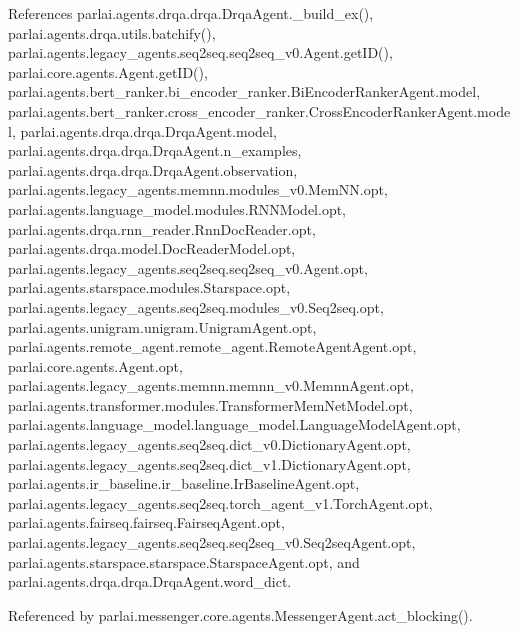 References parlai.\+agents.\+drqa.\+drqa.\+Drqa\+Agent.\+\_\+build\+\_\+ex(), parlai.\+agents.\+drqa.\+utils.\+batchify(), parlai.\+agents.\+legacy\+\_\+agents.\+seq2seq.\+seq2seq\+\_\+v0.\+Agent.\+get\+I\+D(), parlai.\+core.\+agents.\+Agent.\+get\+I\+D(), parlai.\+agents.\+bert\+\_\+ranker.\+bi\+\_\+encoder\+\_\+ranker.\+Bi\+Encoder\+Ranker\+Agent.\+model, parlai.\+agents.\+bert\+\_\+ranker.\+cross\+\_\+encoder\+\_\+ranker.\+Cross\+Encoder\+Ranker\+Agent.\+model, parlai.\+agents.\+drqa.\+drqa.\+Drqa\+Agent.\+model, parlai.\+agents.\+drqa.\+drqa.\+Drqa\+Agent.\+n\+\_\+examples, parlai.\+agents.\+drqa.\+drqa.\+Drqa\+Agent.\+observation, parlai.\+agents.\+legacy\+\_\+agents.\+memnn.\+modules\+\_\+v0.\+Mem\+N\+N.\+opt, parlai.\+agents.\+language\+\_\+model.\+modules.\+R\+N\+N\+Model.\+opt, parlai.\+agents.\+drqa.\+rnn\+\_\+reader.\+Rnn\+Doc\+Reader.\+opt, parlai.\+agents.\+drqa.\+model.\+Doc\+Reader\+Model.\+opt, parlai.\+agents.\+legacy\+\_\+agents.\+seq2seq.\+seq2seq\+\_\+v0.\+Agent.\+opt, parlai.\+agents.\+starspace.\+modules.\+Starspace.\+opt, parlai.\+agents.\+legacy\+\_\+agents.\+seq2seq.\+modules\+\_\+v0.\+Seq2seq.\+opt, parlai.\+agents.\+unigram.\+unigram.\+Unigram\+Agent.\+opt, parlai.\+agents.\+remote\+\_\+agent.\+remote\+\_\+agent.\+Remote\+Agent\+Agent.\+opt, parlai.\+core.\+agents.\+Agent.\+opt, parlai.\+agents.\+legacy\+\_\+agents.\+memnn.\+memnn\+\_\+v0.\+Memnn\+Agent.\+opt, parlai.\+agents.\+transformer.\+modules.\+Transformer\+Mem\+Net\+Model.\+opt, parlai.\+agents.\+language\+\_\+model.\+language\+\_\+model.\+Language\+Model\+Agent.\+opt, parlai.\+agents.\+legacy\+\_\+agents.\+seq2seq.\+dict\+\_\+v0.\+Dictionary\+Agent.\+opt, parlai.\+agents.\+legacy\+\_\+agents.\+seq2seq.\+dict\+\_\+v1.\+Dictionary\+Agent.\+opt, parlai.\+agents.\+ir\+\_\+baseline.\+ir\+\_\+baseline.\+Ir\+Baseline\+Agent.\+opt, parlai.\+agents.\+legacy\+\_\+agents.\+seq2seq.\+torch\+\_\+agent\+\_\+v1.\+Torch\+Agent.\+opt, parlai.\+agents.\+fairseq.\+fairseq.\+Fairseq\+Agent.\+opt, parlai.\+agents.\+legacy\+\_\+agents.\+seq2seq.\+seq2seq\+\_\+v0.\+Seq2seq\+Agent.\+opt, parlai.\+agents.\+starspace.\+starspace.\+Starspace\+Agent.\+opt, and parlai.\+agents.\+drqa.\+drqa.\+Drqa\+Agent.\+word\+\_\+dict.



Referenced by parlai.\+messenger.\+core.\+agents.\+Messenger\+Agent.\+act\+\_\+blocking().


